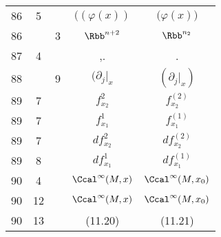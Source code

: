 \documentclass[a4paper,11pt]{article}
\numberwithin{equation}{section}
\begin{document}
\begin{center}
\begin{tabular}{|c|c|c|c|c|}
    86  & \hphantom{0}5 & & $( ( \varphi( x ) )$ & $\big( \varphi( x ) \big)$ \\
    86  & & \hphantom{0}3 & $\Rbb^{ n + 2 }$ & $\Rbb^{ n_{ 2 } }$ \\
    87  & \hphantom{0}4 & & ,. & . \\
    88  & & \hphantom{0}9 & $( \partial_{ j }|_{ x }$ & $( \partial_{ j }|_{ x } )$ \\
    89  & \hphantom{0}7 & & $f_{ x_{ 2 } }^{ 2 }$ & $f_{ x_{ 2 } }^{ ( 2 ) }$ \\
    89  & \hphantom{0}7 & & $f_{ x_{ 1 } }^{ 1 }$ & $f_{ x_{ 1 } }^{ ( 1 ) }$ \\
    89  & \hphantom{0}7 & & $d f_{ x_{ 2 } }^{ 2 }$
    & $d f_{ x_{ 2 } }^{ ( 2 ) }$ \\
    89  & \hphantom{0}8 & & $d f_{ x_{ 1 } }^{ 1 }$
    & $d f_{ x_{ 1 } }^{ ( 1 ) }$ \\
    90  & \hphantom{0}4 & & $\Ccal^{ \infty }( M, x )$
    & $\Ccal^{ \infty }( M, x_{ 0 } )$ \\
    90  & 12 & & $\Ccal^{ \infty }( M, x )$
           & $\Ccal^{ \infty }( M, x_{ 0 } )$ \\
    90  & 13 & & (11.20) & (11.21) \\[0.3em]
    \hline
  \end{tabular}





  \newpage


\end{center}
\end{document}
